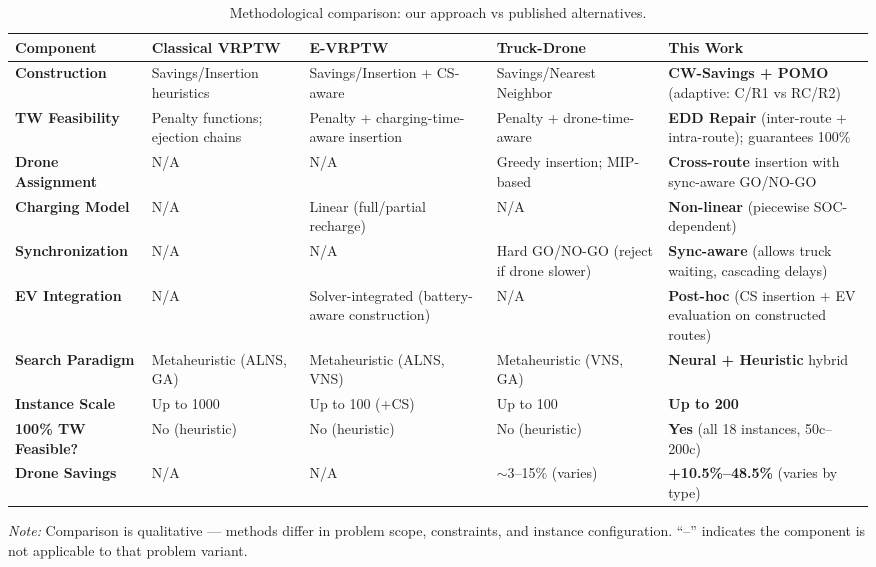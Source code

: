 \begin{table}[t]
\caption{Methodological comparison: our approach vs published alternatives.}
\label{tab:method_compare}
\small
\centering
\begin{tabular}{l p{2.8cm} p{3.0cm} p{2.8cm} p{2.4cm}}
\toprule
\textbf{Component} & \textbf{Classical VRPTW}~\cite{ropke2006alns,vidal2013hybrid} & \textbf{E-VRPTW}~\cite{schneider2014evrp,keskin2016partial} & \textbf{Truck-Drone}~\cite{wang2017vrpd,liu2024cooperated} & \textbf{This Work} \\
\midrule
\textbf{Construction} & Savings/Insertion heuristics & Savings/Insertion + CS-aware & Savings/Nearest Neighbor & \textbf{CW-Savings + POMO} (adaptive: C/R1 vs RC/R2) \\
\midrule
\textbf{TW Feasibility} & Penalty functions; ejection chains & Penalty + charging-time-aware insertion & Penalty + drone-time-aware & \textbf{EDD Repair} (inter-route + intra-route); guarantees 100\% \\
\midrule
\textbf{Drone Assignment} & N/A & N/A & Greedy insertion; MIP-based & \textbf{Cross-route} insertion with sync-aware GO/NO-GO \\
\midrule
\textbf{Charging Model} & N/A & Linear (full/partial recharge) & N/A & \textbf{Non-linear} (piecewise SOC-dependent) \\
\midrule
\textbf{Synchronization} & N/A & N/A & Hard GO/NO-GO (reject if drone slower) & \textbf{Sync-aware} (allows truck waiting, cascading delays) \\
\midrule
\textbf{EV Integration} & N/A & Solver-integrated (battery-aware construction) & N/A & \textbf{Post-hoc} (CS insertion + EV evaluation on constructed routes) \\
\midrule
\textbf{Search Paradigm} & Metaheuristic (ALNS, GA) & Metaheuristic (ALNS, VNS) & Metaheuristic (VNS, GA) & \textbf{Neural + Heuristic} hybrid \\
\midrule
\textbf{Instance Scale} & Up to 1000 & Up to 100 (+CS) & Up to 100 & \textbf{Up to 200} \\
\midrule
\textbf{100\% TW Feasible?} & No (heuristic) & No (heuristic) & No (heuristic) & \textbf{Yes} (all 18 instances, 50c--200c) \\
\midrule
\textbf{Drone Savings} & N/A & N/A & $\sim$3--15\% (varies) & \textbf{+10.5\%--48.5\%} (varies by type) \\
\bottomrule
\end{tabular}

\vspace{4pt}
\footnotesize
\textit{Note:} Comparison is qualitative — methods differ in problem scope, constraints, and instance configuration.
``--'' indicates the component is not applicable to that problem variant.
\end{table}
